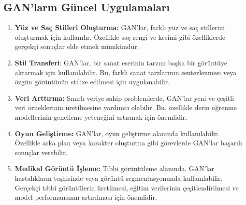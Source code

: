 \documentclass[12pt]{article}
\begin{document}
\subsection{GAN'ların Güncel Uygulamaları}
\begin{enumerate}[label=\textbf{\arabic*.}, leftmargin=*]
\item\textbf{Yüz ve Saç Stilleri Oluşturma:} GAN'lar, farklı yüz ve saç stillerini oluşturmak için kullanılır. Özellikle saç rengi ve kesimi gibi özelliklerde gerçekçi sonuçlar elde etmek mümkündür.

\item\textbf{Stil Transferi}: GAN'lar, bir sanat eserinin tarzını başka bir görüntüye aktarmak için kullanılabilir. Bu, farklı sanat tarzlarının sentezlenmesi veya özgün görüntünün stilize edilmesi için uygulanabilir.

\item\textbf{Veri Arttırma:} Sınırlı veriye sahip problemlerde, GAN'lar yeni ve çeşitli veri örneklerinin üretilmesine yardımcı olabilir. Bu, özellikle derin öğrenme modellerinin genelleme yeteneğini artırmak için önemlidir.

\item\textbf{Oyun Geliştirme:} GAN'lar, oyun geliştirme alanında kullanılabilir. Özellikle arka plan veya karakter oluşturma gibi görevlerde GAN'lar başarılı sonuçlar verebilir.

\item \textbf{Medikal Görüntü İşleme: }Tıbbi görüntüleme alanında, GAN'lar hastalıkların teşhisinde veya görüntü segmentasyonunda kullanılabilir. Gerçekçi tıbbi görüntülerin üretilmesi, eğitim verilerinin çeşitlendirilmesi ve model performansının artırılması için önemlidir.
\end{enumerate}
\end{document}

